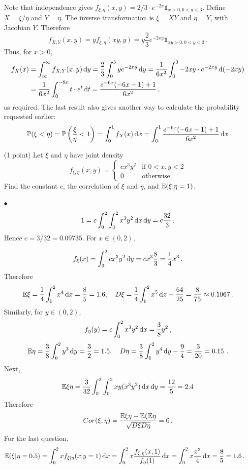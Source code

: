 \documentclass[a4paper]{report}
\begin{document}
Note that independence gives
$f_{\xi, \eta}(x,y) = 2/3 \cdot e^{-2x} \mathbb{1}_{x > 0, 0 < y < 3}$.
Define $X=\xi/\eta$ and $Y=\eta$. The inverse transformation
is
$\xi=XY$ and $\eta=Y$, with Jacobian $Y$. Therefore
\[
f_{X,Y}(x,y) = yf_{\xi,\eta}(xy,y) = y\frac23 e^{-2xy}\mathbb{1}_{xy>0,
0<y<3} \, .
\]
Thus, for $x>0$,
\begin{align*}
f_X(x) &= \int_\infty^\infty f_{X,Y}(x,y) \, \mathrm{d} y =
\frac23 \int_0^3 ye^{-2xy} \, \mathrm{d} y
= \frac{1}{6x^2} \int_0^3 -2xy \cdot e^{-2xy} \, \mathrm{d} (-2xy)\\
&= \frac{1}{6x^2} \int_0^{-6x} t \cdot e^t \, \mathrm{d} t
 = \frac{e^{-6x}(-6x - 1) + 1}{6x^2} \, ,
\end{align*}
as required.
The last result also gives another way to calculate
the probability requested earlier:
\[
\mathbb P(\xi < \eta) = \mathbb P\left(\frac{\xi}{\eta}< 1\right) = \int_0^1 f_X(x) \, \mathrm{d} x
= \int_0^1\frac{e^{-6x}(-6x - 1) + 1}{6x^2} \, \mathrm{d} x
\]
\begin{problem} (1 point)
Let $\xi$ and $\eta$ have joint density
\[
f_{\xi, \eta}(x, y) = \begin{cases}
c x^3 y^2 & \text{if } 0<x,y<2\\
0 & \text{otherwise.}
\end{cases}
\]
Find the constant $c$, the correlation of $\xi$ and $\eta$, and
$\mathbb {E}(\xi| \eta = 1)$.
\end{problem}
$\bullet$
\[
1 = c \int_0^2 \int_0^2 x^3 y^2 \, \mathrm{d} x \, \mathrm{d} y = c \frac{32}{3} \, .
\]
Hence $c=3/32=0.09735$. For $x\in(0,2)$,

\begin{align*}
f_\xi(x) = \int_0^2 cx^3 y^2 \, \mathrm{d} y = cx^3 \frac{8}{3} = \frac14 x^3 \, .
\end{align*}
Therefore
\[ \mathbb {E} \xi = \frac14 \int_0^2 x^4 \, \mathrm{d} x = \frac85 = 1.6, \quad
D \xi = \frac14\int_0^2 x^5 \, \mathrm{d} x - \frac{64}{25} = \frac{8}{75}\approx 0.1067 \, .\]
Similarly, for $y\in(0,2)$,
\[
f_\eta(y) = c\int_0^2 x^3 y^2\, \mathrm{d} x = \frac{3}{8}y^2\, ,
\]
\[
\mathbb {E} \eta = \frac38\int_0^2 y^3 \, \mathrm{d} y  =
\frac{3}{2} =1.5 , \quad
D \eta = \frac38\int_0^2 y^4 \, \mathrm{d} y - \frac94 = \frac{3}{20} = 0.15\, \, .
\]
Next,
\[
\mathbb {E} \xi \eta = \frac{3}{32} \int_0^2 \int_0^2 xy(x^3y^2) \, \mathrm{d} x \, \mathrm{d} y
= \frac{12}{5} = 2.4
\]
Therefore
\[
Cor(\xi, \eta) =\frac{ \mathbb {E} \xi\eta - \mathbb {E} \xi \mathbb {E} \eta}
{\sqrt{D\xi D\eta}}= 0 \, .
\]
For the last question,
\begin{align*}
\mathbb {E} (\xi | \eta = 0.5) &= \int_0^2 x f_{\xi|\eta}(x | y = 1) \, \mathrm{d} x
= \int_0^2 x \frac{f_{\xi, \eta}(x, 1)}{f_\eta(1)} \, \mathrm{d} x
= \int_0 ^2 x \frac{x^3}{4}\, \mathrm{d} x
= \frac85=1.6 \, .
\end{align*}
\end{document}
